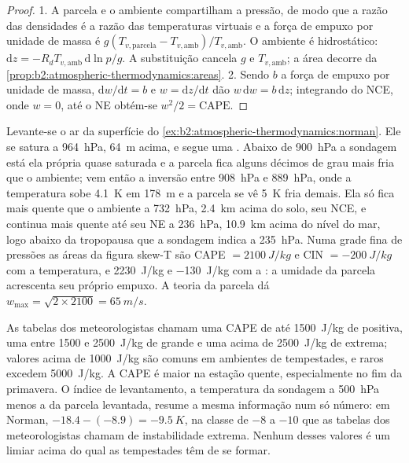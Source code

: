 \begin{proof}
1. A parcela e o ambiente compartilham a pressão, de modo que a razão das densidades é a razão das
temperaturas virtuais e a força de empuxo por unidade de massa é
$g(T_{v,\text{parcela}} - T_{v,\text{amb}})/T_{v,\text{amb}}$. O ambiente é hidrostático:
$\mathrm{d}z = -R_dT_{v,\text{amb}}\,\mathrm{d}\ln p/g$. A substituição cancela $g$ e
$T_{v,\text{amb}}$; a área decorre da \cref{prop:b2:atmospheric-thermodynamics:areas}.
2. Sendo $b$ a força de empuxo por unidade de massa, $\mathrm{d}w/\mathrm{d}t = b$ e $w = \mathrm{d}z/
\mathrm{d}t$ dão $w\,\mathrm{d}w = b\,\mathrm{d}z$; integrando do NCE, onde $w = 0$, até
o NE obtém-se $w^2/2 = \text{CAPE}$.
\end{proof}

\begin{example}\label{ex:b2:atmospheric-thermodynamics:cape}
Levante-se o ar da superfície do \cref{ex:b2:atmospheric-thermodynamics:norman}. Ele se satura a
\qty{964}{hPa}, \qty{64}{m} acima, e segue uma . Abaixo de \qty{900}{hPa} a sondagem está
ela própria quase saturada e a parcela fica alguns décimos de grau mais fria que o
ambiente; vem então a inversão entre \qty{908}{hPa} e \qty{889}{hPa}, onde a
temperatura sobe \qty{4.1}{K} em \qty{178}{m} e a parcela se vê \qty{5}{K} fria demais.
Ela só fica mais quente que o ambiente a \qty{732}{hPa}, \qty{2.4}{km} acima do
solo, seu NCE, e continua mais quente até seu NE a \qty{236}{hPa}, \qty{10.9}{km} acima do nível do mar,
logo abaixo da tropopausa que a sondagem indica a \qty{235}{hPa}. Numa grade fina de pressões as
áreas da figura skew-T são CAPE $= \qty{2100}{J/kg}$ e CIN $= \qty{-200}{J/kg}$ com a
temperatura, e \qty{2230}{J/kg} e \qty{-130}{J/kg} com a : a umidade
da parcela acrescenta seu próprio empuxo. A teoria da parcela dá $w_{\max} = \sqrt{2 \times 2100} =
\qty{65}{m/s}$.
\end{example}

As tabelas dos meteorologistas chamam uma CAPE de até \qty{1500}{J/kg} de positiva, uma entre 1500 e
\qty{2500}{J/kg} de grande e uma acima de \qty{2500}{J/kg} de extrema; valores acima de \qty{1000}{J/kg} são comuns em ambientes de tempestades,
e raros excedem \qty{5000}{J/kg}. A CAPE é maior na estação quente, especialmente no fim da
primavera. O índice de levantamento, a temperatura da sondagem a \qty{500}{hPa} menos a da parcela
levantada, resume a mesma informação num só número: em Norman, $-18.4 - (-8.9) = \qty{-9.5}{K}$,
na classe de $-8$ a $-10$ que as tabelas dos meteorologistas chamam de instabilidade extrema. Nenhum
desses valores é um limiar acima do qual as tempestades têm de se formar.

